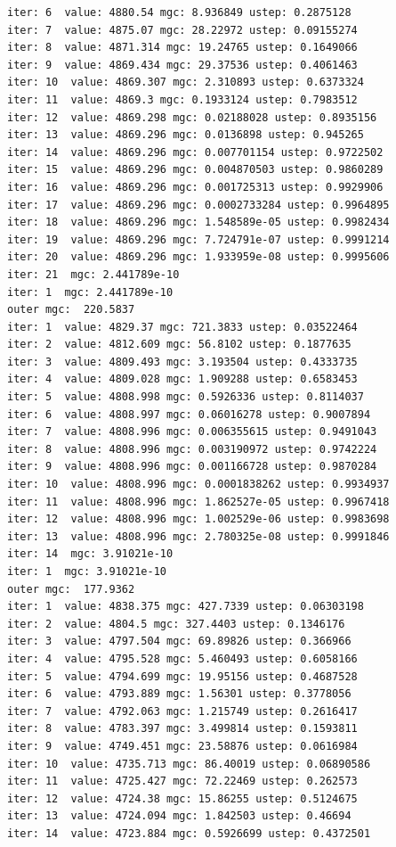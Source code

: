 \documentclass[
  letterpaper,
  DIV=11,
  numbers=noendperiod]{scrartcl}
\begin{document}
\begin{verbatim}
iter: 6  value: 4880.54 mgc: 8.936849 ustep: 0.2875128 
iter: 7  value: 4875.07 mgc: 28.22972 ustep: 0.09155274 
iter: 8  value: 4871.314 mgc: 19.24765 ustep: 0.1649066 
iter: 9  value: 4869.434 mgc: 29.37536 ustep: 0.4061463 
iter: 10  value: 4869.307 mgc: 2.310893 ustep: 0.6373324 
iter: 11  value: 4869.3 mgc: 0.1933124 ustep: 0.7983512 
iter: 12  value: 4869.298 mgc: 0.02188028 ustep: 0.8935156 
iter: 13  value: 4869.296 mgc: 0.0136898 ustep: 0.945265 
iter: 14  value: 4869.296 mgc: 0.007701154 ustep: 0.9722502 
iter: 15  value: 4869.296 mgc: 0.004870503 ustep: 0.9860289 
iter: 16  value: 4869.296 mgc: 0.001725313 ustep: 0.9929906 
iter: 17  value: 4869.296 mgc: 0.0002733284 ustep: 0.9964895 
iter: 18  value: 4869.296 mgc: 1.548589e-05 ustep: 0.9982434 
iter: 19  value: 4869.296 mgc: 7.724791e-07 ustep: 0.9991214 
iter: 20  value: 4869.296 mgc: 1.933959e-08 ustep: 0.9995606 
iter: 21  mgc: 2.441789e-10 
iter: 1  mgc: 2.441789e-10 
outer mgc:  220.5837 
iter: 1  value: 4829.37 mgc: 721.3833 ustep: 0.03522464 
iter: 2  value: 4812.609 mgc: 56.8102 ustep: 0.1877635 
iter: 3  value: 4809.493 mgc: 3.193504 ustep: 0.4333735 
iter: 4  value: 4809.028 mgc: 1.909288 ustep: 0.6583453 
iter: 5  value: 4808.998 mgc: 0.5926336 ustep: 0.8114037 
iter: 6  value: 4808.997 mgc: 0.06016278 ustep: 0.9007894 
iter: 7  value: 4808.996 mgc: 0.006355615 ustep: 0.9491043 
iter: 8  value: 4808.996 mgc: 0.003190972 ustep: 0.9742224 
iter: 9  value: 4808.996 mgc: 0.001166728 ustep: 0.9870284 
iter: 10  value: 4808.996 mgc: 0.0001838262 ustep: 0.9934937 
iter: 11  value: 4808.996 mgc: 1.862527e-05 ustep: 0.9967418 
iter: 12  value: 4808.996 mgc: 1.002529e-06 ustep: 0.9983698 
iter: 13  value: 4808.996 mgc: 2.780325e-08 ustep: 0.9991846 
iter: 14  mgc: 3.91021e-10 
iter: 1  mgc: 3.91021e-10 
outer mgc:  177.9362 
iter: 1  value: 4838.375 mgc: 427.7339 ustep: 0.06303198 
iter: 2  value: 4804.5 mgc: 327.4403 ustep: 0.1346176 
iter: 3  value: 4797.504 mgc: 69.89826 ustep: 0.366966 
iter: 4  value: 4795.528 mgc: 5.460493 ustep: 0.6058166 
iter: 5  value: 4794.699 mgc: 19.95156 ustep: 0.4687528 
iter: 6  value: 4793.889 mgc: 1.56301 ustep: 0.3778056 
iter: 7  value: 4792.063 mgc: 1.215749 ustep: 0.2616417 
iter: 8  value: 4783.397 mgc: 3.499814 ustep: 0.1593811 
iter: 9  value: 4749.451 mgc: 23.58876 ustep: 0.0616984 
iter: 10  value: 4735.713 mgc: 86.40019 ustep: 0.06890586 
iter: 11  value: 4725.427 mgc: 72.22469 ustep: 0.262573 
iter: 12  value: 4724.38 mgc: 15.86255 ustep: 0.5124675 
iter: 13  value: 4724.094 mgc: 1.842503 ustep: 0.46694 
iter: 14  value: 4723.884 mgc: 0.5926699 ustep: 0.4372501 

\end{verbatim}
\end{document}
